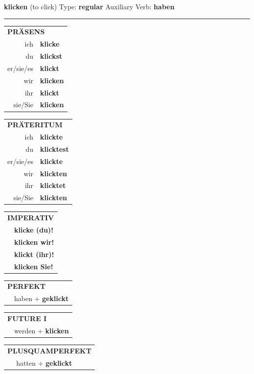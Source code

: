 \documentclass[10pt,a4paper]{revtex4-2}
\begin{document}
\begin{verbbox}
{\Large \bf klicken} (to click) \hfill Type: \textbf{regular} \hfill Auxiliary Verb: \textbf{haben} 

\vspace{5pt}
\hrule
\vspace{5pt}

\begin{tabular}{rl}
\multicolumn{2}{l}{\textbf{PRÄSENS}}\\
ich & \textbf{klicke}\\
du & \textbf{klickst}\\
er/sie/es & \textbf{klickt}\\
wir & \textbf{klicken}\\
ihr & \textbf{klickt}\\
sie/Sie & \textbf{klicken}\\
\end{tabular}
\hfill
\begin{tabular}{rl}
\multicolumn{2}{l}{\textbf{PRÄTERITUM}}\\
ich & \textbf{klickte}\\
du & \textbf{klicktest}\\
er/sie/es & \textbf{klickte}\\
wir & \textbf{klickten}\\
ihr & \textbf{klicktet}\\
sie/Sie & \textbf{klickten}\\
\end{tabular}
\hfill
\begin{tabular}{rl}
\multicolumn{2}{l}{\textbf{IMPERATIV}}\\
& \textbf{klicke (du)!}\\
& \textbf{klicken wir!}\\
& \textbf{klickt (ihr)!}\\
& \textbf{klicken Sie!}\\
\end{tabular}

\vspace{10pt}

\begin{tabular}{rl}
\multicolumn{2}{l}{\textbf{PERFEKT}}\\
& haben + \textbf{geklickt}\\
\end{tabular}
\hfill
\begin{tabular}{rl}
\multicolumn{2}{l}{\textbf{FUTURE I}}\\
& werden + \textbf{klicken}\\
\end{tabular}
\hfill
\begin{tabular}{rl}
\multicolumn{2}{l}{\textbf{PLUSQUAMPERFEKT}}\\
& hatten + \textbf{geklickt}\\
\end{tabular}


\end{verbbox}
\end{document}
